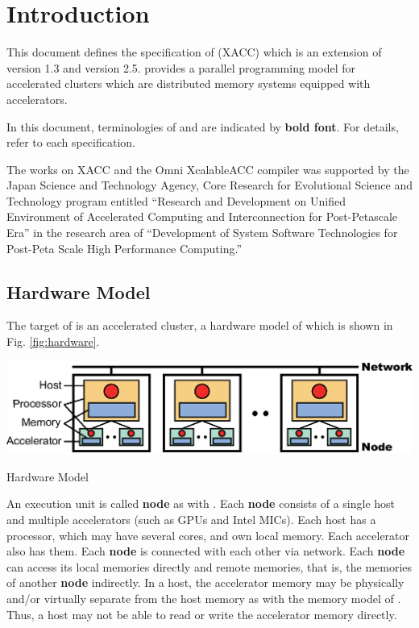 \section{Introduction}\label{chap:intro}

\setcounter{page}{1}

This document defines the specification of {\XACC} (XACC) which is an extension
of {\XMP} version 1.3\cite{xmp} and {\OACC} version 2.5\cite{openacc}.
{\XACC} provides a parallel programming model for accelerated clusters
which are distributed memory systems equipped with accelerators.

In this document,
terminologies of {\XMP} and {\OACC} are indicated by {\bf bold font}.
For details, refer to each specification\cite{xmp,openacc}.

The works on XACC and the Omni XcalableACC compiler was
supported by the Japan Science and Technology Agency, 
Core Research for Evolutional Science and Technology program entitled 
``Research and Development on Unified Environment of Accelerated
Computing and Interconnection for Post-Petascale Era'' in the research
area of ``Development of System Software Technologies for Post-Peta
Scale High Performance Computing.''

\subsection{Hardware Model}
The target of {\XACC} is an accelerated cluster,
a hardware model of which is shown in Fig. \ref{fig:hardware}.

\begin{myfigure}
  \includegraphics[scale=0.9,clip]{figs/hardware.eps}
  \caption{Hardware Model}\label{fig:hardware}
\end{myfigure}

An execution unit is called {\bf node} as with {\XMP}.
Each {\bf node} consists of a single host and multiple accelerators (such as GPUs and Intel MICs).
Each host has a processor, which may have several cores, and own local memory.
Each accelerator also has them.
Each {\bf node} is connected with each other via network.
Each {\bf node} can access its local memories directly and remote memories,
that is, the memories of another {\bf node} indirectly.
In a host,
the accelerator memory may be physically and/or virtually separate from the host memory as with the memory model of {\OACC}.
Thus,
a host may not be able to read or write the accelerator memory directly.


